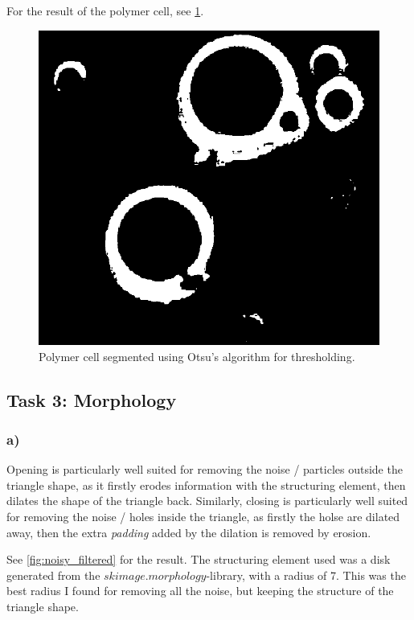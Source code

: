 For the result of the polymer cell, see \cref{fig:polymercell_segmented}.
\begin{figure}[]
    \centering
    \includegraphics[width=1.00\textwidth]{figures/image_processed/polymercell-segmented.png}
    \caption{Polymer cell segmented using Otsu's algorithm for thresholding. }
    \label{fig:polymercell_segmented}
\end{figure}

\subsection{Task 3: Morphology}
\subsubsection*{a)}
Opening is particularly well suited for removing the noise / particles outside the triangle shape, as it firstly erodes information with the structuring element, then dilates the shape of the triangle back. Similarly, closing is particularly well suited for removing the noise / holes inside the triangle, as firstly the holse are dilated away, then the extra \textit{padding} added by the dilation is removed by erosion. 

See \cref{fig:noisy_filtered} for the result. The structuring element used was a disk generated from the $skimage.morphology$-library, with a radius of 7. This was the best radius I found for removing all the noise, but keeping the structure of the triangle shape. 

